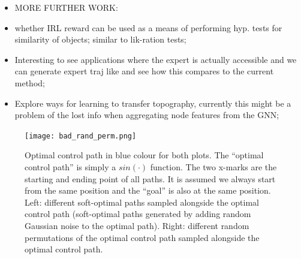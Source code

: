 \documentclass{report}
\numberwithin{equation}{section}
\numberwithin{figure}{section}
\numberwithin{table}{section}
\numberwithin{algorithm}{section}
\begin{document}
\begin{itemize}
  \item MORE FURTHER WORK:
  \item whether IRL reward can be used as a means of performing 
  hyp. tests for similarity of objects; similar to 
  lik-ration tests;
  \item Interesting to see applications where the 
  expert is actually accessible and we can generate expert traj like \citep{FinnGCL} 
  and see how this compares to the current method;
  \item Explore ways for learning to transfer topography, currently this might be a problem of the lost info when aggregating node features from the GNN;
\end{itemize}

\begin{figure}[H]
  \centering
  \texttt{[image: bad\_rand\_perm.png]}
  \caption{\label{fig:bad_rand_perm} Optimal control path 
  in blue colour for both plots. The ``optimal control path'' 
  is simply a $sin(\cdot)$ function. The two x-marks are the 
  starting and ending point of all paths. It is assumed 
  we always start from the same position and the ``goal'' is also 
  at the same position. Left: different soft-optimal 
  paths sampled alongside the optimal control path (soft-optimal 
  paths generated by adding random Gaussian noise to the optimal 
  path). Right: different 
  random permutations of the optimal control path sampled alongside 
  the optimal control path.}
\end{figure}



\end{document}
